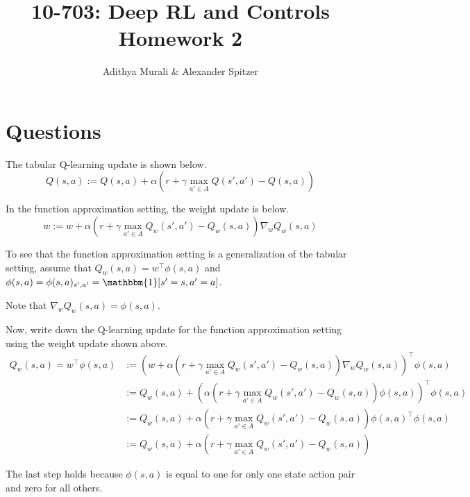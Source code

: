 \documentclass[letterpaper]{article}
\begin{document}
\title{10-703: Deep RL and Controls Homework 2}
\author{Adithya Murali \& Alexander Spitzer}

\date{\vspace{-5ex}}

\maketitle

\section{Questions}
The tabular Q-learning update is shown below.
\begin{equation}
  Q(s, a) := Q(s, a) + \alpha\left(r + \gamma \max_{a' \in A} Q(s', a') - Q(s, a)\right)
\end{equation}

In the function approximation setting, the weight update is below.
\begin{equation}
  w := w + \alpha\left(r + \gamma \max_{a' \in A} Q_w(s', a') - Q_w(s, a)\right) \nabla_wQ_w(s, a)
\end{equation}

To see that the function approximation setting is a generalization of the tabular setting, assume that $Q_w(s, a) = w^\top\phi(s, a)$ and $\phi(s, a) = \phi(s, a)_{s',a'} = \mathbbm{1}[s' = s, a' = a]$.

Note that $\nabla_wQ_w(s, a) = \phi(s, a)$.

Now, write down the Q-learning update for the function approximation setting using the weight update shown above.
\begin{align}
  Q_w(s, a) = w^\top\phi(s, a) &:= \left(w + \alpha\left(r + \gamma \max_{a' \in A} Q_w(s', a') - Q_w(s, a)\right) \nabla_wQ_w(s, a)\right)^\top\phi(s, a)\nonumber\\
  &:= Q_w(s, a) + \left(\alpha\left(r + \gamma \max_{a' \in A} Q_w(s', a') - Q_w(s, a)\right)\phi(s, a)\right)^\top\phi(s, a)\nonumber\\
  &:= Q_w(s, a) + \alpha\left(r + \gamma \max_{a' \in A} Q_w(s', a') - Q_w(s, a)\right)\phi(s, a)^\top\phi(s, a)\nonumber\\
  &:= Q_w(s, a) + \alpha\left(r + \gamma \max_{a' \in A} Q_w(s', a') - Q_w(s, a)\right)
\end{align}

The last step holds because $\phi(s, a) $ is equal to one for only one state action pair and zero for all others.
\end{document}
